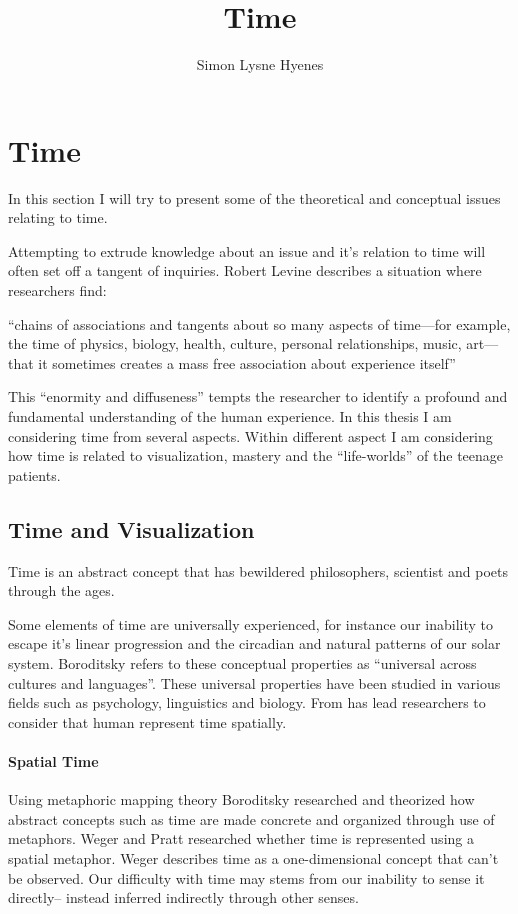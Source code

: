 \documentclass[11pt,UKenglish, a4paper]{article}
\author{Simon Lysne Hyenes}
\title{Time}
\begin{document}
\section{Time}
In this section I will try to present some of the theoretical and conceptual issues relating to time.

Attempting to extrude knowledge about an issue and it's relation to time will often set off a tangent of inquiries. Robert Levine describes a situation where researchers find: 

	``chains of associations and tangents about so many aspects of time---for example, the time of physics, biology, health, culture, personal relationships, music, art---that it sometimes creates a mass free association about experience itself''\cite[preface~xvii]{Levine2008Geography}


This ``enormity and diffuseness''\cite[preface~xvii]{Levine2008Geography} tempts the researcher to identify a profound and fundamental understanding of the human experience. In this thesis I am considering time from several aspects. Within different aspect I am considering how time is related to visualization, mastery and the ``life-worlds'' of the teenage patients. 
 
 \subsection{Time and Visualization}
Time is an abstract concept that has bewildered philosophers, scientist and poets through the ages.

Some elements of time are universally experienced, for instance our inability to escape it's linear progression and the circadian and natural patterns of our solar system. Boroditsky refers to these conceptual properties as ``universal across cultures and languages''\cite[p.~4]{Boroditsky2000Metaphoric}. These universal properties have been studied in various fields such as psychology, linguistics and biology. From  has lead researchers to consider that human represent time spatially. 

\paragraph*{Spatial Time}

Using metaphoric mapping theory Boroditsky researched and theorized how abstract concepts such as time are made concrete and organized through use of metaphors. Weger and Pratt researched whether time is represented using a spatial metaphor\cite{Weger2008Time}. Weger describes time as a one-dimensional concept that can't be observed. Our difficulty with time may stems from our inability to sense it directly-- instead inferred indirectly through other senses.  
\end{document}
